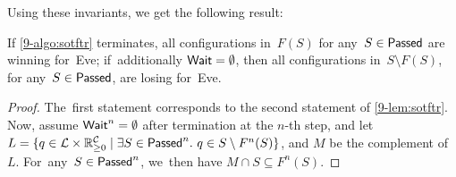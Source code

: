 Using these invariants, we get the following result:
\begin{lemma}
  If \cref{9-algo:sotftr} terminates, all configurations in~$F(S)$ for
  any~$S\in\textsf{Passed}$ are winning for~Eve;  if~additionally
  $\textsf{Wait}=\emptyset$, then all configurations in~$S\setminus F(S)$, for
  any~$S\in\textsf{Passed}$, are losing for~Eve.
\end{lemma}

\begin{proof}
The~first statement corresponds to the second statement of
\cref{9-lem:sotftr}. Now, assume $\textsf{Wait}^n=\emptyset$ after
termination at the $n$-th step,
and
let $L=\{q\in \mathcal{L}\times\mathbb{R}_{\geq 0}^{\mathcal{C}} \mid \exists
S\in\textsf{Passed}^n.\ q\in S\setminus F^n(S)\}$, and $M$ be the complement
of~$L$. For~any~$S\in\textsf{Passed}^n$, we~then have $M\cap S\subseteq
F^n(S)$.


\end{proof}
